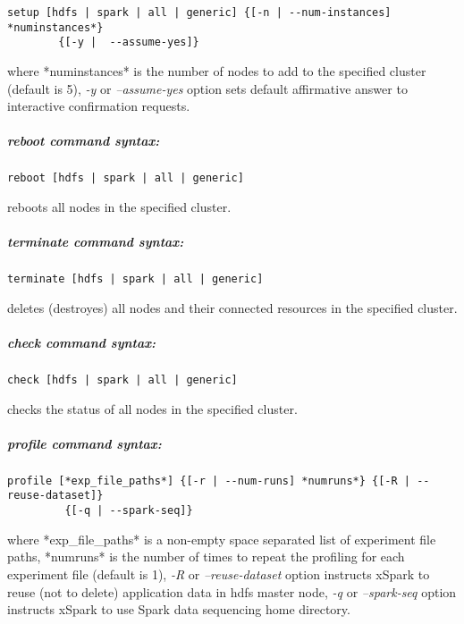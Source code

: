 \documentclass[
]{article}
\let\oldsubparagraph\subparagraph
\renewcommand{\subparagraph}[1]{\oldsubparagraph{#1}\mbox{}}
\begin{document}
\begin{verbatim}
setup [hdfs | spark | all | generic] {[-n | --num-instances] *numinstances*} 
        {[-y |  --assume-yes]}
\end{verbatim}

where *numinstances* is the number of nodes to add to the specified
cluster (default is 5), \emph{-y} or \emph{--assume-yes} option sets
default affirmative answer to interactive confirmation requests.

\hypertarget{reboot-command-syntax}{%
\subparagraph{\texorpdfstring{\emph{reboot} command
syntax:}{reboot command syntax:}}\label{reboot-command-syntax}}

\begin{verbatim}
reboot [hdfs | spark | all | generic]
\end{verbatim}

reboots all nodes in the specified cluster.

\hypertarget{terminate-command-syntax}{%
\subparagraph{\texorpdfstring{\emph{terminate} command
syntax:}{terminate command syntax:}}\label{terminate-command-syntax}}

\begin{verbatim}
terminate [hdfs | spark | all | generic]
\end{verbatim}

deletes (destroyes) all nodes and their connected resources in the
specified cluster.

\hypertarget{check-command-syntax}{%
\subparagraph{\texorpdfstring{\emph{check} command
syntax:}{check command syntax:}}\label{check-command-syntax}}

\begin{verbatim}
check [hdfs | spark | all | generic]
\end{verbatim}

checks the status of all nodes in the specified cluster.

\hypertarget{profile-command-syntax}{%
\subparagraph{\texorpdfstring{\emph{profile} command
syntax:}{profile command syntax:}}\label{profile-command-syntax}}

\begin{verbatim}
profile [*exp_file_paths*] {[-r | --num-runs] *numruns*} {[-R | --reuse-dataset]} 
         {[-q | --spark-seq]}      
\end{verbatim}

where *exp\_file\_paths* is a non-empty space separated list of
experiment file paths, *numruns* is the number of times to repeat the
profiling for each experiment file (default is 1), \emph{-R} or
\emph{--reuse-dataset} option instructs xSpark to reuse (not to delete)
application data in hdfs master node, \emph{-q} or \emph{--spark-seq}
option instructs xSpark to use Spark data sequencing home directory.
\end{document}
